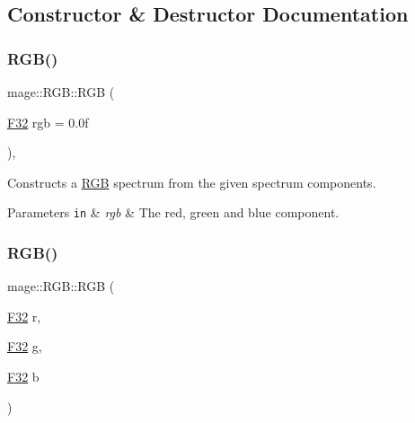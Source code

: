 \subsection{Constructor \& Destructor Documentation}
\hypertarget{structmage_1_1_r_g_b_a02c4573299da3acc4ff6fc3e3874ef2e}{}\label{structmage_1_1_r_g_b_a02c4573299da3acc4ff6fc3e3874ef2e} 
\subsubsection{\texorpdfstring{R\+G\+B()}{RGB()}\hspace{0.1cm}{\footnotesize\ttfamily [1/8]}}
{\footnotesize\ttfamily mage\+::\+R\+G\+B\+::\+R\+GB (\begin{DoxyParamCaption}\item[{\hyperlink{namespacemage_aa97e833b45f06d60a0a9c4fc22ae02c0}{F32}}]{rgb = {\ttfamily 0.0f} }\end{DoxyParamCaption})\hspace{0.3cm}{\ttfamily [explicit]}, {\ttfamily [noexcept]}}

Constructs a \hyperlink{structmage_1_1_r_g_b}{R\+GB} spectrum from the given spectrum components.


\begin{DoxyParams}[1]{Parameters}
\mbox{\tt in}  & {\em rgb} & The red, green and blue component. \\
\hline
\end{DoxyParams}
\hypertarget{structmage_1_1_r_g_b_ae8bf65bd6df05e7ebfc420311ee7992b}{}\label{structmage_1_1_r_g_b_ae8bf65bd6df05e7ebfc420311ee7992b} 
\subsubsection{\texorpdfstring{R\+G\+B()}{RGB()}\hspace{0.1cm}{\footnotesize\ttfamily [2/8]}}
{\footnotesize\ttfamily mage\+::\+R\+G\+B\+::\+R\+GB (\begin{DoxyParamCaption}\item[{\hyperlink{namespacemage_aa97e833b45f06d60a0a9c4fc22ae02c0}{F32}}]{r,  }\item[{\hyperlink{namespacemage_aa97e833b45f06d60a0a9c4fc22ae02c0}{F32}}]{g,  }\item[{\hyperlink{namespacemage_aa97e833b45f06d60a0a9c4fc22ae02c0}{F32}}]{b }\end{DoxyParamCaption})\hspace{0.3cm}{\ttfamily [noexcept]}}

